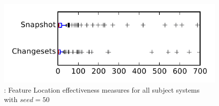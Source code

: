 
\begin{figure}
\centering
\includegraphics[height=0.4\textheight]{figures/flt_seed/rq1_tiny_50}
\caption{\rone: Feature Location effectiveness measures for all subject systems with $seed=50$}
\label{fig:flt_seed:rq1:tiny}
\end{figure}

